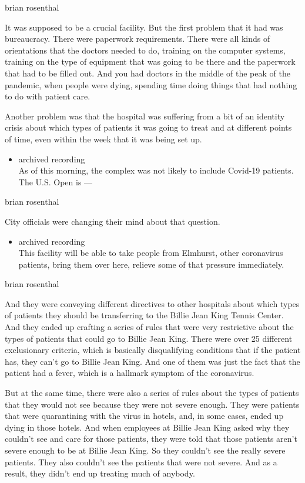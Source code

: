 brian rosenthal

It was supposed to be a crucial facility. But the first problem that it
had was bureaucracy. There were paperwork requirements. There were all
kinds of orientations that the doctors needed to do, training on the
computer systems, training on the type of equipment that was going to be
there and the paperwork that had to be filled out. And you had doctors
in the middle of the peak of the pandemic, when people were dying,
spending time doing things that had nothing to do with patient care.

Another problem was that the hospital was suffering from a bit of an
identity crisis about which types of patients it was going to treat and
at different points of time, even within the week that it was being set
up.

\begin{itemize}
\tightlist
\item
  archived recording\\
  As of this morning, the complex was not likely to include Covid-19
  patients. The U.S. Open is ---
\end{itemize}

brian rosenthal

City officials were changing their mind about that question.

\begin{itemize}
\tightlist
\item
  archived recording\\
  This facility will be able to take people from Elmhurst, other
  coronavirus patients, bring them over here, relieve some of that
  pressure immediately.
\end{itemize}

brian rosenthal

And they were conveying different directives to other hospitals about
which types of patients they should be transferring to the Billie Jean
King Tennis Center. And they ended up crafting a series of rules that
were very restrictive about the types of patients that could go to
Billie Jean King. There were over 25 different exclusionary criteria,
which is basically disqualifying conditions that if the patient has,
they can't go to Billie Jean King. And one of them was just the fact
that the patient had a fever, which is a hallmark symptom of the
coronavirus.

But at the same time, there were also a series of rules about the types
of patients that they would not see because they were not severe enough.
They were patients that were quarantining with the virus in hotels, and,
in some cases, ended up dying in those hotels. And when employees at
Billie Jean King asked why they couldn't see and care for those
patients, they were told that those patients aren't severe enough to be
at Billie Jean King. So they couldn't see the really severe patients.
They also couldn't see the patients that were not severe. And as a
result, they didn't end up treating much of anybody.

